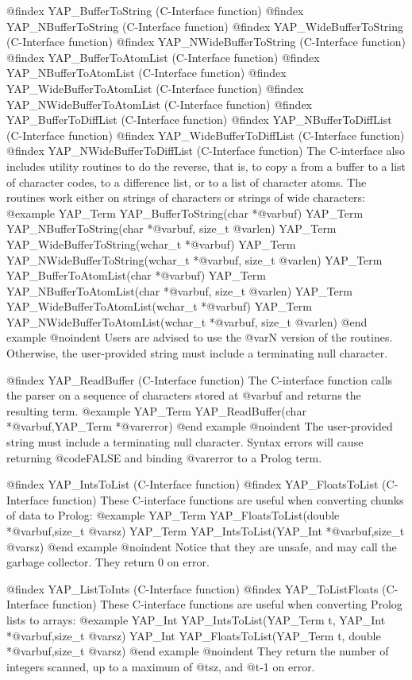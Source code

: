 {{{{{{{{{@findex YAP_BufferToString (C-Interface function)
@findex YAP_NBufferToString (C-Interface function)
@findex YAP_WideBufferToString (C-Interface function)
@findex YAP_NWideBufferToString (C-Interface function)
@findex YAP_BufferToAtomList (C-Interface function)
@findex YAP_NBufferToAtomList (C-Interface function)
@findex YAP_WideBufferToAtomList (C-Interface function)
@findex YAP_NWideBufferToAtomList (C-Interface function)
@findex YAP_BufferToDiffList (C-Interface function)
@findex YAP_NBufferToDiffList (C-Interface function)
@findex YAP_WideBufferToDiffList (C-Interface function)
@findex YAP_NWideBufferToDiffList (C-Interface function)
The C-interface also includes utility routines to do the reverse, that
is, to copy a from a buffer to a list of character codes, to a
difference list,  or to a list of
character atoms. The routines work either on strings of characters or
strings of wide characters:
@example
      YAP_Term YAP_BufferToString(char *@var{buf})
      YAP_Term YAP_NBufferToString(char *@var{buf}, size_t @var{len})
      YAP_Term YAP_WideBufferToString(wchar_t *@var{buf})
      YAP_Term YAP_NWideBufferToString(wchar_t *@var{buf}, size_t @var{len})
      YAP_Term YAP_BufferToAtomList(char *@var{buf})
      YAP_Term YAP_NBufferToAtomList(char *@var{buf}, size_t @var{len})
      YAP_Term YAP_WideBufferToAtomList(wchar_t *@var{buf})
      YAP_Term YAP_NWideBufferToAtomList(wchar_t *@var{buf}, size_t @var{len})
@end example
@noindent
Users are advised to use the @var{N} version of the routines. Otherwise,
the user-provided string must include a terminating null character.

@findex YAP_ReadBuffer (C-Interface function)
The C-interface function calls the parser on a sequence of characters
stored at @var{buf} and returns the resulting term.
@example
      YAP_Term YAP_ReadBuffer(char *@var{buf},YAP_Term *@var{error})
@end example
@noindent
The user-provided string must include a terminating null
character. Syntax errors will cause returning @code{FALSE} and binding
@var{error} to a Prolog term.

@findex YAP_IntsToList (C-Interface function)
@findex YAP_FloatsToList (C-Interface function)
These C-interface functions are useful when converting chunks of data to Prolog:
@example
      YAP_Term YAP_FloatsToList(double *@var{buf},size_t @var{sz})
      YAP_Term YAP_IntsToList(YAP_Int *@var{buf},size_t @var{sz})
@end example
@noindent
Notice that they are unsafe, and may call the garbage collector. They
return 0 on error.

@findex YAP_ListToInts (C-Interface function)
@findex YAP_ToListFloats (C-Interface function)
These C-interface functions are useful when converting Prolog lists to arrays:
@example
      YAP_Int YAP_IntsToList(YAP_Term t, YAP_Int *@var{buf},size_t @var{sz})
      YAP_Int YAP_FloatsToList(YAP_Term t, double *@var{buf},size_t @var{sz})
@end example
@noindent
They return the number of integers scanned, up to a maximum of @t{sz},
and @t{-1} on error.

}}}}}}}}}
